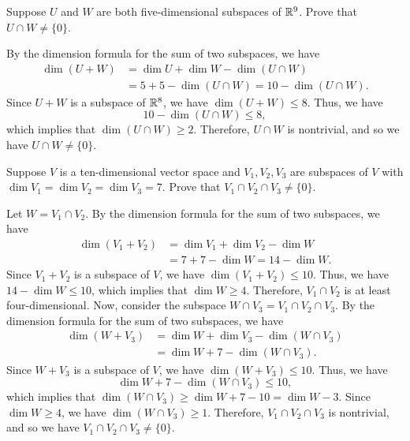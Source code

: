 \begin{exc}
\begin{exercise}
Suppose $U$ and $W$ are both five-dimensional subspaces of $\mathbb{R}^9$. Prove that
$U\cap W\ne\{0\}$.
\end{exercise}
\begin{solution}
By the dimension formula for the sum of two subspaces, we have
\begin{align*}
\dim(U+W) &= \dim U+\dim W-\dim(U\cap W)\\
  &= 5+5-\dim(U\cap W) = 10-\dim(U\cap W).
\end{align*}
Since $U+W$ is a subspace of $\mathbb{R}^8$, we have $\dim(U+W)\le8$. Thus, we have
\[ 10-\dim(U\cap W) \le 8, \]
which implies that $\dim(U\cap W)\ge2$. Therefore, $U\cap W$ is nontrivial, and
so we have $U\cap W\ne\{0\}$.
\end{solution}

\begin{exercise}
Suppose $V$ is a ten-dimensional vector space and $V_1,V_2,V_3$ are subspaces
of $V$ with $\dim V_1=\dim V_2=\dim V_3=7$. Prove that
$V_1\cap V_2\cap V_3\ne\{0\}$.
\end{exercise}
\begin{solution}
Let $W=V_1\cap V_2$. By the dimension formula for the sum of two subspaces, we
have
\begin{align*}
\dim(V_1+V_2) &= \dim V_1+\dim V_2-\dim W\\
  &= 7+7-\dim W = 14-\dim W.
\end{align*}
Since $V_1+V_2$ is a subspace of $V$, we have $\dim(V_1+V_2)\le10$. Thus, we
have $14-\dim W\le10$, which implies that $\dim W\ge4$. Therefore, $V_1\cap V_2$
is at least four-dimensional. Now, consider the subspace
$W\cap V_3=V_1\cap V_2\cap V_3$. By the dimension formula for the sum of two
subspaces, we have
\begin{align*}
\dim(W+V_3) &= \dim W+\dim V_3-\dim(W\cap V_3)\\
  &= \dim W+7-\dim(W\cap V_3).
\end{align*}
Since $W+V_3$ is a subspace of $V$, we have $\dim(W+V_3)\le10$. Thus, we have
\[ \dim W+7-\dim(W\cap V_3) \le 10, \]
which implies that $\dim(W\cap V_3)\ge\dim W+7-10=\dim W-3$. Since
$\dim W\ge4$, we have $\dim(W\cap V_3)\ge1$. Therefore, $V_1\cap V_2\cap V_3$ is
nontrivial, and so we have $V_1\cap V_2\cap V_3\ne\{0\}$.
\end{solution}


\end{exc}
